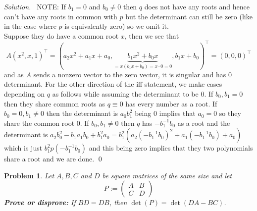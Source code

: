 \documentclass[12pt,a4paper]{article}
\newenvironment{solution}{%
  \par\noindent\textit{Solution.}\ }{\qed}
\theoremstyle{problemstyle}
\newtheorem{problem}{Problem}[section]
\begin{document}
\begin{solution}
    NOTE: If $b_1=0$ and $b_0\neq 0$ then $q$ does not have any roots and hence can't have any roots in common with $p$ but the determinant can still be zero (like in the case where $p$ is equivalently zero) so we omit it. \\
    Suppose they do have a common root $x$, then we see that
    $$A(x^2,x,1)^\top=(a_2x^2+a_1x+a_0,\underbrace{b_1x^2+b_0x}_{=x(b_1x+b_0)=x\cdot 0=0},b_1x+b_0)^{\top}=(0,0,0)^{\top}$$
    and as $A$ sends a nonzero vector to the zero vector, it is singular and has $0$ determinant. For the other direction of the iff statement, we make cases depending on $q$ as follows while assuming the determinant to be $0$. 
    If $b_0,b_1=0$ then they share common roots as $q\equiv 0$ has every number as a root. 
    If $b_0=0,b_1\neq 0$ then the determinant is $a_0b_1^2$ being $0$ implies that $a_0=0$ so they share the common root $0$.
    If $b_0,b_1\neq 0$ then $q$ has $-b_1^{-1}b_0$ as a root and the determinant is $a_2b_0^2-b_1a_1b_0+b_1^2a_0=b_1^2(a_2(-b_1^{-1}b_0)^2+a_1(-b_1^{-1}b_0)+a_0)$ which is just $b_1^2 p(-b_1^{-1}b_0)$ and this being zero implies that they two polynomials share a root and we are done. 
\end{solution}
\begin{problem}\label{prob:1.10}
    Let $A, B, C$ and $D$ be square matrices of the same size and let
    \[
    P := \begin{pmatrix} A & B \\ C & D \end{pmatrix}
    \]
    \textbf{Prove or disprove:} If $BD = DB$, then $\det(P) = \det(DA - BC)$.
\end{problem}
\end{document}
